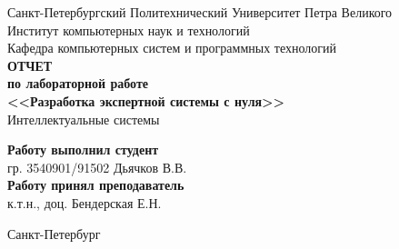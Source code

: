 \begin{titlepage}
\begin{center}
	Санкт-Петербургский Политехнический Университет Петра Великого\\[0.3cm]
	Институт компьютерных наук и технологий \\[0.3cm]
	Кафедра компьютерных систем и программных технологий\\[4cm]
	
	\textbf{ОТЧЕТ}\\ 
	\textbf{по лабораторной работе}\\[0.5cm]
	\textbf{<<Разработка экспертной системы с нуля>>}\\[0.1cm]
	Интеллектуальные системы\\[3.0cm]
\end{center}

\begin{flushright}
	\begin{minipage}{0.5\textwidth}
		\textbf{Работу выполнил студент}\\[3mm]
		гр. 3540901/91502 \hfill \sign[1.1cm] \hfill Дьячков В.В.\\[5mm]
		\textbf{Работу принял преподаватель}\\[5mm]
		\sign[2.1cm] \hfill к.т.н., доц. Бендерская Е.Н. \\[5mm]
	\end{minipage}
\end{flushright}

\vfill

\begin{center}
	Санкт-Петербург\\[0.3cm]
	\the\year
\end{center}
\end{titlepage}

\addtocounter{page}{1}